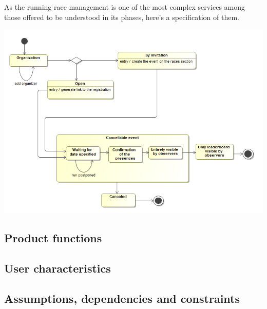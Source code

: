 As the running race management is one of the most complex services among those offered to be understood in its phases, here's a specification of them.

\begin{center}
\includegraphics[scale=0.4]{sections/diagrams/stateDiagram.png}
\end{center}
\subsection{Product functions}
\subsection{User characteristics}
\subsection{Assumptions, dependencies and constraints}
%
